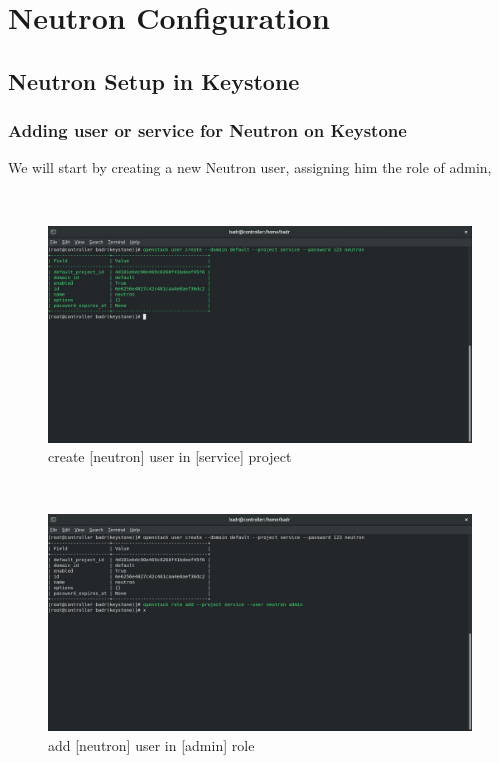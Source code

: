 \chapter{Neutron Configuration}
\begin{spacing}{1.2}
\section{Neutron Setup in Keystone}
\subsection{Adding user or service for Neutron on Keystone}
\par We will start by creating a new Neutron user, assigning him the role of admin,

\\
\begin{figure}[!htb] 
\begin{center} 
\includegraphics[width=1\linewidth]{Cloud/Neutron Setup in Keystone/create [neutron] user in [service] project} 
\end{center} 
\caption{create [neutron] user in [service] project} 
\end{figure} 
\FloatBarrier
\\
\begin{figure}[!htb] 
\begin{center} 
\includegraphics[width=1\linewidth]{Cloud/Neutron Setup in Keystone/add [neutron] user in [admin] role}
\end{center} 
\caption{add [neutron] user in [admin] role} 
\end{figure} 
\FloatBarrier


\end{spacing}
